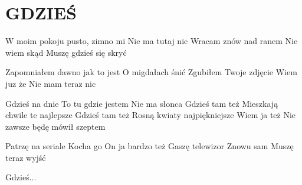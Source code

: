 \documentclass[../../../songbook.tex]{subfiles}
\begin{document}
\TabPositions{7cm} %
\section*{GDZIEŚ}
{}
\vspace{0.5cm}
W moim pokoju pusto, zimno mi	 \newline
Nie ma tutaj nic					 \newline
Wracam znów nad ranem \newline
Nie wiem skąd \newline
Muszę gdzieś się skryć \newline

Zapomniałem dawno jak to jest \newline
O migdałach śnić \newline
Zgubiłem Twoje zdjęcie \newline
Wiem juz że  \newline
Nie mam teraz nic \newline

\-\hspace{1cm} Gdzieś na dnie   \newline  
\-\hspace{1cm} To tu gdzie jestem  \newline
\-\hspace{1cm} Nie ma słonca \newline
\-\hspace{1cm} Gdzieś tam też  \newline
\-\hspace{1cm} Mieszkają chwile te najlepsze \newline
\-\hspace{1cm} Gdzieś tam też \newline
\-\hspace{1cm} Rosną kwiaty najpiękniejsze \newline
\-\hspace{1cm} Wiem ja też \newline
\-\hspace{1cm} Nie zawsze będę mówił szeptem \newline

Patrzę na seriale  \newline
Kocha go  \newline
On ja bardzo też \newline
Gaszę telewizor  \newline
Znowu sam \newline
Muszę teraz wyjść \newline

\-\hspace{1cm} Gdzieś... \newline
\end{document}

